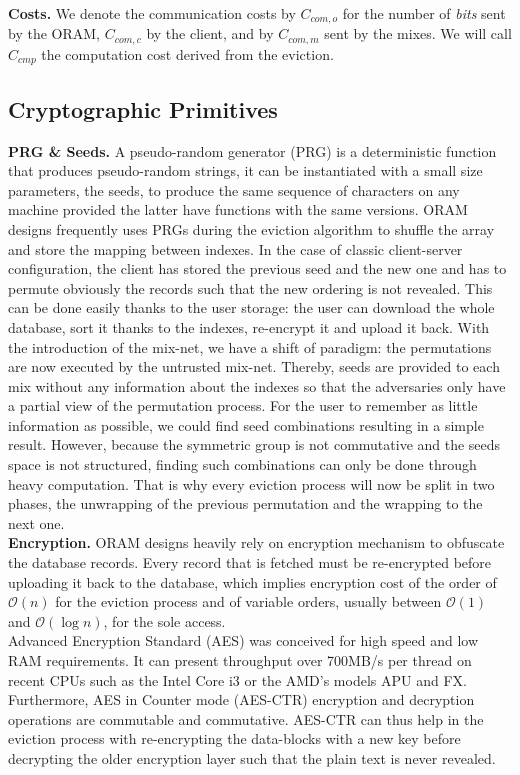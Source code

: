 \documentclass{llncs}
\begin{document}
\noindent\textbf{Costs.} We denote the communication costs by $C_{com,o}$ for the number of \emph{bits} sent by the ORAM, $C_{com,c}$ by the client, and by $C_{com,m}$ sent by the mixes. 
We will call $C_{cmp}$ the computation cost derived from the eviction.
%
\subsection{Cryptographic Primitives}
\noindent\textbf{PRG \& Seeds.}
A pseudo-random generator (PRG) is a deterministic function that produces pseudo-random strings, it can be instantiated with a small size parameters, the seeds, to produce the same sequence of characters on any machine provided the latter have functions with the same versions.
ORAM designs frequently uses PRGs during the eviction algorithm to shuffle the array and store the mapping between indexes.
In the case of classic client-server configuration, the client has stored the previous seed and the new one and has to permute obviously the records such that the new ordering is not revealed. This can be done easily thanks to the user storage: the user can download the whole database, sort it thanks to the indexes, re-encrypt it and upload it back.
With the introduction of the mix-net, we have a shift of paradigm: the permutations are now executed by the untrusted mix-net. Thereby, seeds are provided to each mix without any information about the indexes so that the adversaries only have a partial view of the permutation process.
For the user to remember as little information as possible, we could find seed combinations resulting in a simple result. However, because the symmetric group is not commutative and the seeds space is not structured, finding such combinations can only be done through heavy computation.
That is why every eviction process will now be split in two phases, the unwrapping of the previous permutation and the wrapping to the next one.\\

\noindent\textbf{Encryption.}
ORAM designs heavily rely on encryption mechanism to obfuscate the database records. Every record that is fetched must be re-encrypted before uploading it back to the database, 
which implies encryption cost of the order of $\mathcal{O} \left ( n \right )$ for the eviction process and of variable orders, usually between $\mathcal{O} \left ( 1 \right )$ and $\mathcal{O} \left ( \log n \right )$, for the sole access.\\
Advanced Encryption Standard (AES) was conceived for high speed and low RAM requirements. It can present throughput over 700MB/s per thread on recent CPUs such as the Intel Core i3 or the AMD's models APU and FX.
Furthermore, AES in Counter mode (AES-CTR) encryption and decryption operations are commutable and commutative. AES-CTR can thus help in the eviction process with re-encrypting the data-blocks with a new key before decrypting the older encryption layer such that the plain text is never revealed.
\end{document}
